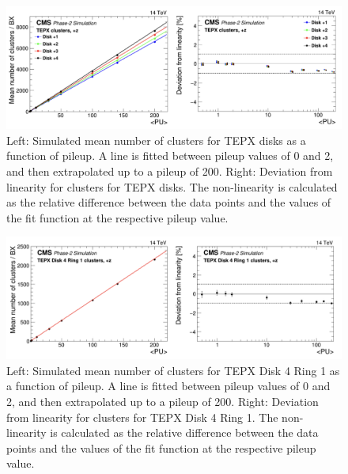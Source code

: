 

\begin{figure}[H]
  \centering
  \includegraphics[width=1\columnwidth]{ashish_thesis/michigan_2.png}
  \caption[TEPX Clusters Fit And Residuals]{\onehalfspacing Left: Simulated mean number of clusters for TEPX disks as a function of pileup. A line is fitted between pileup values of 0 and 2, and then extrapolated up to a pileup of 200. Right: Deviation from linearity for clusters for  TEPX disks. The non-linearity is calculated as the relative difference between the data points and the values of the fit function at the respective pileup value. }
  \label{fig:CMS_4205}
\end{figure}


\begin{figure}[H]
  \centering
  \includegraphics[width=1\columnwidth]{ashish_thesis/michigan_3.png}
  \caption[TEPX Clusters Fit And Residuals]{\onehalfspacing Left: Simulated mean number of clusters for  TEPX Disk 4 Ring 1 as a function of pileup. A line is fitted between pileup values of 0 and 2, and then extrapolated up to a pileup of 200. Right: Deviation from linearity for clusters for TEPX Disk 4 Ring 1. The non-linearity is calculated as the relative difference between the data points and the values of the fit function at the respective pileup value. }
  \label{fig:CMS_4206}
\end{figure}




